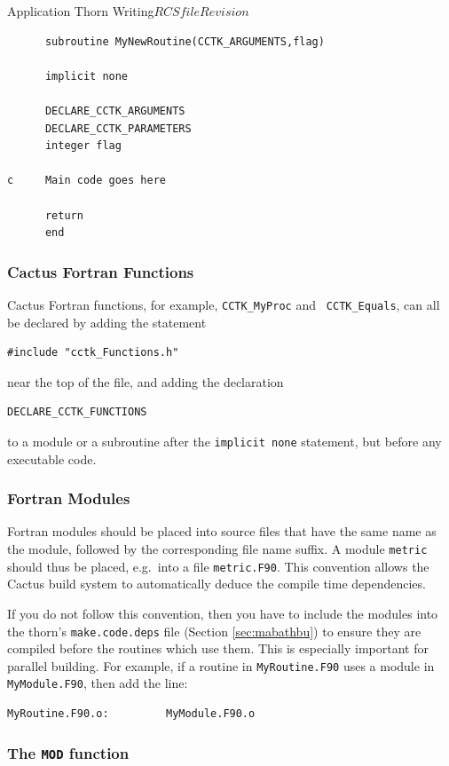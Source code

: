 \begin{cactuspart}{Application Thorn Writing}{$RCSfile$}{$Revision$}
\begin{verbatim}
      subroutine MyNewRoutine(CCTK_ARGUMENTS,flag)

      implicit none

      DECLARE_CCTK_ARGUMENTS
      DECLARE_CCTK_PARAMETERS
      integer flag

c     Main code goes here

      return
      end

\end{verbatim}

\subsubsection{Cactus Fortran Functions}

Cactus Fortran functions, for example, \texttt{CCTK\_MyProc} and {\tt
CCTK\_Equals}, can all be declared by adding the statement
%
\begin{verbatim}
#include "cctk_Functions.h"
\end{verbatim}
%
near the top of the file, and adding the declaration
%
\begin{verbatim}
DECLARE_CCTK_FUNCTIONS
\end{verbatim}
%
to a module or a subroutine after the \texttt{implicit none}
statement, but before any executable code.

\subsubsection{Fortran Modules}

Fortran modules should be placed into source files that have the same
name as the module, followed by the corresponding file name suffix.  A
module \texttt{metric} should thus be placed, e.g.\ into a file
\texttt{metric.F90}.  This convention allows the Cactus build system
to automatically deduce the compile time dependencies.

If you do not follow this convention, then you have to include the
modules into the thorn's \texttt{make.code.deps} file
(Section \ref{sec:mabathbu}) to ensure they are compiled before the routines
which use them.  This is especially important for parallel building.
For example, if a routine in \texttt{MyRoutine.F90} uses a module in {\tt
MyModule.F90}, then add the line:
%
\begin{verbatim}
MyRoutine.F90.o:         MyModule.F90.o
\end{verbatim}

\subsubsection{The \texttt{MOD} function}


\end{cactuspart}
